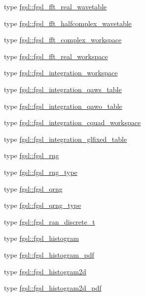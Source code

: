 \begin{DoxyCompactItemize}
\item 
type \hyperlink{structfgsl_1_1fgsl__fft__real__wavetable}{fgsl\-::fgsl\-\_\-fft\-\_\-real\-\_\-wavetable}
\item 
type \hyperlink{structfgsl_1_1fgsl__fft__halfcomplex__wavetable}{fgsl\-::fgsl\-\_\-fft\-\_\-halfcomplex\-\_\-wavetable}
\item 
type \hyperlink{structfgsl_1_1fgsl__fft__complex__workspace}{fgsl\-::fgsl\-\_\-fft\-\_\-complex\-\_\-workspace}
\item 
type \hyperlink{structfgsl_1_1fgsl__fft__real__workspace}{fgsl\-::fgsl\-\_\-fft\-\_\-real\-\_\-workspace}
\item 
type \hyperlink{structfgsl_1_1fgsl__integration__workspace}{fgsl\-::fgsl\-\_\-integration\-\_\-workspace}
\item 
type \hyperlink{structfgsl_1_1fgsl__integration__qaws__table}{fgsl\-::fgsl\-\_\-integration\-\_\-qaws\-\_\-table}
\item 
type \hyperlink{structfgsl_1_1fgsl__integration__qawo__table}{fgsl\-::fgsl\-\_\-integration\-\_\-qawo\-\_\-table}
\item 
type \hyperlink{structfgsl_1_1fgsl__integration__cquad__workspace}{fgsl\-::fgsl\-\_\-integration\-\_\-cquad\-\_\-workspace}
\item 
type \hyperlink{structfgsl_1_1fgsl__integration__glfixed__table}{fgsl\-::fgsl\-\_\-integration\-\_\-glfixed\-\_\-table}
\item 
type \hyperlink{structfgsl_1_1fgsl__rng}{fgsl\-::fgsl\-\_\-rng}
\item 
type \hyperlink{structfgsl_1_1fgsl__rng__type}{fgsl\-::fgsl\-\_\-rng\-\_\-type}
\item 
type \hyperlink{structfgsl_1_1fgsl__qrng}{fgsl\-::fgsl\-\_\-qrng}
\item 
type \hyperlink{structfgsl_1_1fgsl__qrng__type}{fgsl\-::fgsl\-\_\-qrng\-\_\-type}
\item 
type \hyperlink{structfgsl_1_1fgsl__ran__discrete__t}{fgsl\-::fgsl\-\_\-ran\-\_\-discrete\-\_\-t}
\item 
type \hyperlink{structfgsl_1_1fgsl__histogram}{fgsl\-::fgsl\-\_\-histogram}
\item 
type \hyperlink{structfgsl_1_1fgsl__histogram__pdf}{fgsl\-::fgsl\-\_\-histogram\-\_\-pdf}
\item 
type \hyperlink{structfgsl_1_1fgsl__histogram2d}{fgsl\-::fgsl\-\_\-histogram2d}
\item 
type \hyperlink{structfgsl_1_1fgsl__histogram2d__pdf}{fgsl\-::fgsl\-\_\-histogram2d\-\_\-pdf}
\item 

\end{DoxyCompactItemize}
